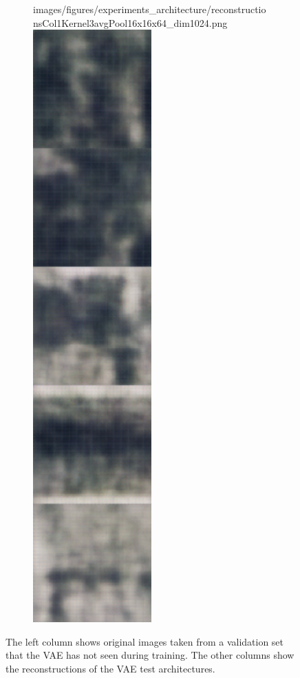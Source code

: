 \begin{figure}[H]
\begin{subfigure}[t]{.19\textwidth}
        {images/figures/experiments_architecture/reconstructionsCol1Kernel3avgPool16x16x64_dim1024.png}\hfill
        \includegraphics[width=0.5\textwidth]
        {images/figures/experiments_architecture/reconstructionsCol2Kernel3avgPool16x16x64_dim1024.png}
        \caption{}
    \end{subfigure}
    \caption{The left column shows original images taken from a validation set that the VAE has not seen during
    training. The other columns show the reconstructions of the VAE test architectures.}
\end{figure}

